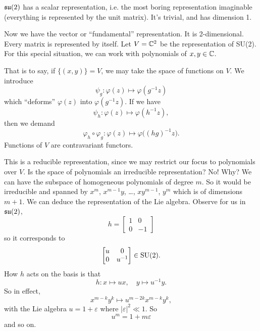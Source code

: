 \begin{rmk}
$\frak{su}(2)$ has a scalar representation, i.e. the most boring
  representation imaginable (everything is represented by the
  unit matrix). It's trivial, and has dimension 1.
\end{rmk}

Now we have the vector or ``fundamental'' representation. It is
2-dimensional. Every matrix is represented by itself. Let
$V=\Bbb{C}^{2}$ be the representation of SU(2). For this special
situation, we can work with polynomials of $x,y\in\Bbb{C}$.

That is to say, if $\{(x,y)\}=V$, we may take the space of
functions on $V$. We introduce
\begin{equation}
\psi_{g}\colon\varphi(z)\mapsto\varphi(g^{-1}z)
\end{equation}
which ``deforms'' $\varphi(z)$ into $\varphi(g^{-1}z)$. If we
have
\begin{equation}
\psi_{h}\colon\varphi(z)\mapsto\varphi(h^{-1}z),
\end{equation}
then we demand
\begin{equation}
\varphi_{h}\circ\varphi_{g}\colon\varphi(z)\mapsto\varphi\big((hg)^{-1}z\big).
\end{equation}
Functions of $V$ are contravariant functors.

This is a reducible representation, since we may restrict our
focus to polynomials over $V$. Is the space of polynomials an
irreducible representation? No! Why? We can have the subspace of
homogeneous polynomials of degree $m$. So it would be irreducible
and spanned by $x^{m}$, $x^{m-1}y$, \dots, $xy^{m-1}$, $y^{m}$
which is of dimensions $m+1$. We can deduce the representation of
the Lie algebra. Observe for us in $\frak{su}(2)$,
\begin{equation}
h=\begin{bmatrix}
1 & 0\\
0 & -1
\end{bmatrix}
\end{equation}
so it corresponds to
\begin{equation}
\begin{bmatrix}
u & 0\\
0 & u^{-1}
\end{bmatrix}\in{\rm SU}(2).
\end{equation}
How $h$ acts on the basis is that
\begin{equation}
h\colon x\mapsto ux,\quad y\mapsto u^{-1}y.
\end{equation}
So in effect,
\begin{equation}
x^{m-k}y^{k}\mapsto u^{m-2k}x^{m-k}y^{k},
\end{equation}
with the Lie algebra $u=1+\varepsilon$ where
$|\varepsilon|^{2}\ll1$. So 
\begin{equation}
u^{m}=1+m\varepsilon
\end{equation}
and so on.
